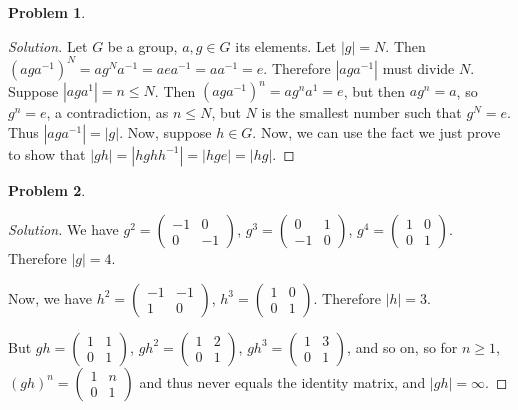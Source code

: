 \documentclass{article}
\theoremstyle{definition}
\newtheorem{problem-internal}{Problem}[subsection]
\newenvironment{problem}{
	\medskip
	\begin{problem-internal}
	}{
\end{problem-internal}
}
\newenvironment{solution}{
	\begin{proof}[Solution]
		\vspace{-8px}
		\setlength{\parskip}{4px}
		\setlength{\parindent}{0px}
	}{
\end{proof}
}
\newcommand{\abs}[1]{\left|#1\right|}
\begin{document}
\begin{problem}
\end{problem}

\begin{solution}
	Let $G$ be a group, $a, g \in G$ its elements. Let $\abs{g}=N$. Then $(aga^{-1})^N=ag^Na^{-1}=aea^{-1}=aa^{-1}=e$. Therefore $\abs{aga^{-1}}$ must divide $N$. Suppose $\abs{aga^{1}}=n \leq N$. Then $(aga^{-1})^n=ag^na^{1}=e$, but then $ag^n=a$, so $g^n=e$, a contradiction, as $n \leq N$, but $N$ is the smallest number such that $g^N = e$. Thus $\abs{aga^{-1}}=\abs{g}$. Now, suppose $h \in G$. Now, we can use the fact we just prove to show that $\abs{gh}=\abs{hghh^{-1}}=\abs{hge}=\abs{hg}$.
\end{solution}

\begin{problem}
\end{problem}

\begin{solution}
	We have $g^2 =
	\begin{pmatrix}
		-1 & 0\\
		0 & -1
	\end{pmatrix}$, $g^3 =
	\begin{pmatrix}
		0 & 1\\
		-1 & 0
	\end{pmatrix}$, $g^4 =
	\begin{pmatrix}
		1 & 0\\
		0 & 1
	\end{pmatrix}$. Therefore $\abs{g}=4$.
	
	Now, we have $h^2 =
	\begin{pmatrix}
		-1 & -1\\
		1 & 0
	\end{pmatrix}$, $h^3 =
	\begin{pmatrix}
		1 & 0\\
		0 & 1
	\end{pmatrix}$. Therefore $\abs{h}=3$.
	
	But $gh =
	\begin{pmatrix}
		1 & 1\\
		0 & 1
	\end{pmatrix}$, $gh^2 =
	\begin{pmatrix}
		1 & 2\\
		0 & 1
	\end{pmatrix}$, $gh^3 =
	\begin{pmatrix}
		1 & 3\\
		0 & 1
	\end{pmatrix}$, and so on, so for $n \geq 1$, $(gh)^n =
	\begin{pmatrix}
		1 & n\\
		0 & 1
	\end{pmatrix}$ and thus never equals the identity matrix, and $\abs{gh}=\infty$.
\end{solution}
\end{document}
